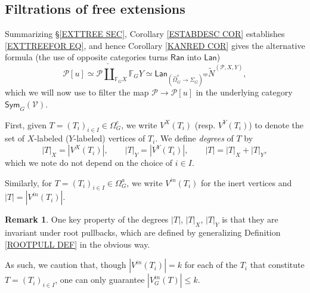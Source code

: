 \documentclass[a4paper,10pt
,draft
]{article}%
\numberwithin{equation}{section}
\numberwithin{figure}{section}
\theoremstyle{definition} %
\newtheorem{remark}[equation]{Remark}%
\newcommand{\Sym}{\ensuremath{\mathsf{Sym}}}%
\newcommand{\V}{\ensuremath{\mathcal V}}
\newcommand{\1}{\ensuremath{\mathbbm 1}}%
\begin{document}
\renewcommand{\labelenumi}{\theenumi}
\renewcommand{\theenumi}{(\roman{enumi})}%

\subsection{Filtrations of free extensions}
\label{FILTRATION_SECTION}

Summarizing \S \ref{EXTTREE SEC},
Corollary \ref{ESTABDESC COR}
establishes \eqref{EXTTREEFOR EQ}, and hence 
Corollary \ref{KANRED COR} 
gives the alternative formula
(the use of opposite categories turns 
$\mathsf{Ran}$ into $\mathsf{Lan}$)
\begin{equation}\label{ALTFOR EQ}
	\mathcal{P}[u] \simeq
	\mathcal{P} \mathbin{\check{\coprod}}_{\mathbb{F}_G X} \mathbb{F}_G Y 
\simeq 
	\mathsf{Lan}_{\left( \widehat{\Omega}_{G}^{e} \to \Sigma_G \right)^{op}}
	\tilde{N}^{(\mathcal{P},X,Y)},
\end{equation}
which we will now use to 
filter the map
$\mathcal{P} \to \mathcal{P}[u]$
in the underlying category
$\Sym_G(\V)$.

First, given 
$T = (T_i)_{i \in I} \in \Omega_G^e$,
we write $V^X(T_i)$ (resp. $V^Y(T_i)$)
to denote the set of 
$X$-labeled ($Y$-labeled) vertices of $T_i$.
We define \textit{degrees} of $T$ by
\[
|T|_X = |V^X(T_i)|,
	\qquad
|T|_Y = |V^Y(T_i)|,
	\qquad
|T| = |T|_X + |T|_Y,
\]
which we note do not depend on the choice of $i \in I$.

Similarly, for $T = (T_i)_{i \in I} \in \Omega_G^a$,
we write $V^{in}(T_i)$ for the inert vertices and
$|T| = |V^{in}(T_i)|$.


\begin{remark}
	One key property of the degrees $|T|$, $|T|_X$, $|T|_Y$ is that they are invariant under root pullbacks, which are defined
	by generalizing Definition \ref{ROOTPULL DEF}
	in the obvious way.
	
	As such, we caution that, though 
	$|V^{in}(T_i)| = k$
	for each of the $T_i$ that constitute $T=(T_i)_{i \in I}$,
	one can only guarantee $|V_G^{in}(T)| \leq k$.
\end{remark}
\end{document}
